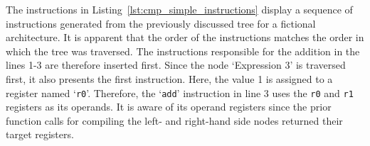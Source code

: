 The instructions in Listing~\ref{lst:cmp_simple_instructions} display a sequence of instructions generated from the previously discussed tree for a fictional architecture.
It is apparent that the order of the instructions matches the order in which the tree was traversed.
The instructions responsible for the addition in the lines 1-3 are therefore inserted first.
Since the node `Expression 3' is traversed first, it also presents the first instruction.
Here, the value 1 is assigned to a register named `\texttt{r0}'.
Therefore, the `\texttt{add}' instruction in line 3 uses the \texttt{r0} and \texttt{r1} registers as its operands.
It is aware of its operand registers since the prior function calls for compiling the left- and right-hand side nodes returned their target registers.

